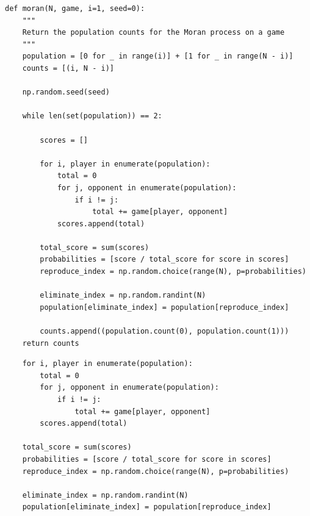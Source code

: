 \documentclass{beamer}
\begin{document}
    \begin{frame}[fragile]{}
        \begin{center}
            \begin{minipage}{0.7\textwidth}
                \begin{verbatim}
def moran(N, game, i=1, seed=0):
    """
    Return the population counts for the Moran process on a game
    """
    population = [0 for _ in range(i)] + [1 for _ in range(N - i)]
    counts = [(i, N - i)]

    np.random.seed(seed)

    while len(set(population)) == 2:

        scores = []

        for i, player in enumerate(population):
            total = 0
            for j, opponent in enumerate(population):
                if i != j:
                    total += game[player, opponent]
            scores.append(total)

        total_score = sum(scores)
        probabilities = [score / total_score for score in scores]
        reproduce_index = np.random.choice(range(N), p=probabilities)

        eliminate_index = np.random.randint(N)
        population[eliminate_index] = population[reproduce_index]

        counts.append((population.count(0), population.count(1)))
    return counts
            \end{verbatim}
        \end{minipage}
    \end{center}
\end{frame}

    \begin{frame}[fragile]{}
        \begin{center}
            \begin{minipage}{0.7\textwidth}
                \begin{verbatim}
    for i, player in enumerate(population):
        total = 0
        for j, opponent in enumerate(population):
            if i != j:
                total += game[player, opponent]
        scores.append(total)

    total_score = sum(scores)
    probabilities = [score / total_score for score in scores]
    reproduce_index = np.random.choice(range(N), p=probabilities)

    eliminate_index = np.random.randint(N)
    population[eliminate_index] = population[reproduce_index]
            \end{verbatim}
        \end{minipage}
    \end{center}
\end{frame}
\end{document}
